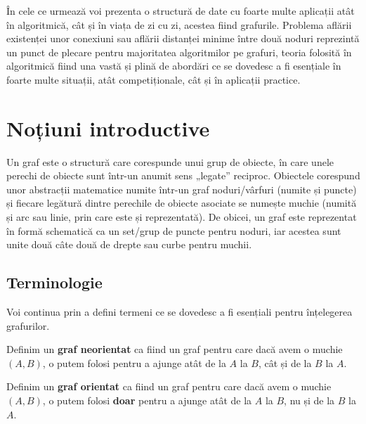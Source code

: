


În cele ce urmează voi prezenta o structură de date cu foarte multe aplicații atât în algoritmică, cât și în viața de zi cu zi, acestea fiind grafurile. Problema aflării existenței unor conexiuni sau aflării distanței minime între două noduri reprezintă un punct de plecare pentru majoritatea algoritmilor pe grafuri, teoria folosită în algoritmică fiind una vastă și plină de abordări ce se dovedesc a fi esențiale în foarte multe situații, atât competiționale, cât și în aplicații practice. 

\section{Noțiuni introductive}

\begin{definition}
Un graf este o structură care corespunde unui grup de obiecte, în care unele perechi de obiecte sunt într-un anumit sens „legate” reciproc. Obiectele corespund unor abstracții matematice numite într-un graf noduri/vârfuri (numite și puncte) și fiecare legătură dintre perechile de obiecte asociate se numește muchie (numită și arc sau linie, prin care este și reprezentată). De obicei, un graf este reprezentat în formă schematică ca un set/grup de puncte pentru noduri, iar acestea sunt unite două câte două de drepte sau curbe pentru muchii. 
\end{definition}

\subsection{Terminologie}

Voi continua prin a defini termeni ce se dovedesc a fi esențiali pentru înțelegerea grafurilor.

\begin{definition}
    Definim un \textbf{graf neorientat} ca fiind un graf pentru care dacă avem o muchie $(A, B)$, o putem folosi pentru a ajunge atât de la $A$ la $B$, cât și de la $B$ la $A$.
\end{definition}

\begin{definition}
    Definim un \textbf{graf orientat} ca fiind un graf pentru care dacă avem o muchie $(A, B)$, o putem folosi \textbf{doar} pentru a ajunge atât de la $A$ la $B$, nu și de la $B$ la $A$.
\end{definition}

